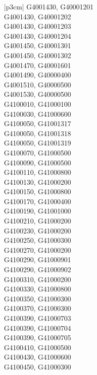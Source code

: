\begin{customLongTable}{ |p{3cm}| }
G4001430, G40001201 \\ \hline
G4001430, G40001202 \\ \hline
G4001430, G40001203 \\ \hline
G4001430, G40001204 \\ \hline
G4001450, G40001301 \\ \hline
G4001450, G40001302 \\ \hline
G4001470, G40001601 \\ \hline
G4001490, G40000400 \\ \hline
G4001510, G40000500 \\ \hline
G4001530, G40000500 \\ \hline
G4100010, G41000100 \\ \hline
G4100030, G41000600 \\ \hline
G4100050, G41001317 \\ \hline
G4100050, G41001318 \\ \hline
G4100050, G41001319 \\ \hline
G4100070, G41000500 \\ \hline
G4100090, G41000500 \\ \hline
G4100110, G41000800 \\ \hline
G4100130, G41000200 \\ \hline
G4100150, G41000800 \\ \hline
G4100170, G41000400 \\ \hline
G4100190, G41001000 \\ \hline
G4100210, G41000200 \\ \hline
G4100230, G41000200 \\ \hline
G4100250, G41000300 \\ \hline
G4100270, G41000200 \\ \hline
G4100290, G41000901 \\ \hline
G4100290, G41000902 \\ \hline
G4100310, G41000200 \\ \hline
G4100330, G41000800 \\ \hline
G4100350, G41000300 \\ \hline
G4100370, G41000300 \\ \hline
G4100390, G41000703 \\ \hline
G4100390, G41000704 \\ \hline
G4100390, G41000705 \\ \hline
G4100410, G41000500 \\ \hline
G4100430, G41000600 \\ \hline
G4100450, G41000300 \\ \hline

\end{customLongTable}
